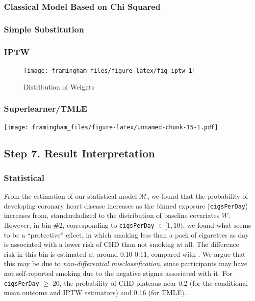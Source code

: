 \documentclass[]{article}
\begin{document}
\hypertarget{classical-model-based-on-chi-squared}{%
\subsubsection{Classical Model Based on Chi
Squared}\label{classical-model-based-on-chi-squared}}

\hypertarget{simple-substitution}{%
\subsubsection{Simple Substitution}\label{simple-substitution}}

\hypertarget{iptw}{%
\subsubsection{IPTW}\label{iptw}}

\begin{figure}[h]

{\centering \texttt{[image: framingham\_files/figure-latex/fig iptw-1]} 

}

\caption{Distribution of Weights}\label{fig:fig iptw}
\end{figure}

\hypertarget{superlearnertmle}{%
\subsubsection{Superlearner/TMLE}\label{superlearnertmle}}

\texttt{[image: framingham\_files/figure-latex/unnamed-chunk-15-1.pdf]}

\hypertarget{step-7.-result-interpretation}{%
\subsection{Step 7. Result
Interpretation}\label{step-7.-result-interpretation}}

\hypertarget{statistical}{%
\subsubsection{Statistical}\label{statistical}}

From the estimation of our statistical model \(\mathcal{M}\), we found
that the probability of developing coronary heart disease increases as
the binned exposure (\texttt{cigsPerDay}) increases from, standardadized
to the distribution of baseline covariates \(W\). However, in bin \#2,
corresponding to \texttt{cigsPerDay} \(\in [1, 10)\), we found what
seems to be a ``protective'' effect, in which smoking less than a pack
of cigarettes as day is associated with a lower risk of CHD than not
smoking at all. The difference risk in this bin is estimated at around
0.10-0.11, compared with . We argue that this may be due to
\textit{non-differential misclassification}, since participants may have
not self-reported smoking due to the negative stigma associated with it.
For \texttt{cigsPerDay} \(\geq\) 20, the probability of CHD plateaus
near 0.2 (for the conditional mean outcome and IPTW estimators) and 0.16
(for TMLE).
\end{document}
